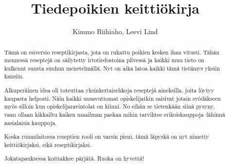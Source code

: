 \documentclass[%
a4paper,
11pt,
]{article}
\begin{document}
\title{Tiedepoikien keittiökirja}
\author{Kimmo Riihiaho, Leevi Lind}
\maketitle

\renewcommand{\abstractname}{Alkusanastelut}
\begin{abstract}
    \noindent 
	Tämä on esiversio reseptikirjasta, jota on rukattu poikien kesken ihan vitusti. 
	Tähän mennessä reseptejä on säilytetty irtotiedostoina pilvessä ja kaikki muu tieto on kulkenut 
	suusta suuhun menetelmällä. Nyt on aika latoa kaikki tämä tietämys yksiin kansiin. 
	
	Alkuperäinen idea oli toteuttaa yksinkertaisehkoja 
    reseptejä aineksilla, joita löytyy kaupasta helposti. Näin kaikki uusavuttomat opiskelijatkin saisivat 
    jotain syödäkseen myös silloin kun opiskelijaravintolat on kiinni. No eihän se tietenkään siinä pysyny, vaan 
    ollaan kikkailtu kaiken maailman paskaa mihin tarvihtee erikoiskauppoja--lähinnä aasialaisia 
    kauppoja.
    
    Koska ruuanlaitossa reseptien rooli on varsin pieni, tämä läpyskä on nyt nimetty keittiökirjaksi, eikä 
    reseptikirjaksi. 
    
    Jokatapauksessa koittakkee pärjätä. Ruoka on hyvettä!
\end{abstract}

\newpage
\tableofcontents

\newpage


\newpage


\newpage


\newpage


\newpage

\end{document}
